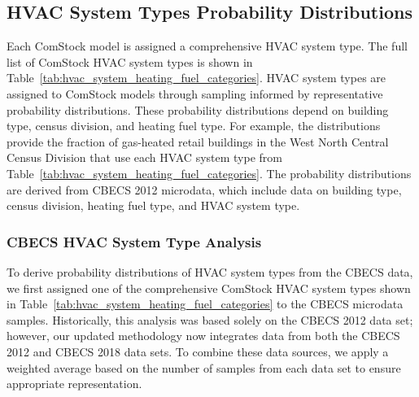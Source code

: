 
\vspace{5mm}
\subsection{HVAC System Types Probability Distributions}
\label{sec:HVAC_System_Type}

Each ComStock model is assigned a comprehensive HVAC system type. The full list of ComStock HVAC system types is shown in Table~\ref{tab:hvac_system_heating_fuel_categories}. HVAC system types are assigned to ComStock models through sampling informed by representative probability distributions. These probability distributions depend on building type, census division, and heating fuel type. For example, the distributions provide the fraction of gas-heated retail buildings in the West North Central Census Division that use each HVAC system type from Table~\ref{tab:hvac_system_heating_fuel_categories}. The probability distributions are derived from CBECS 2012 microdata, which include data on building type, census division, heating fuel type, and HVAC system type.



\subsubsection{CBECS HVAC System Type Analysis}

To derive probability distributions of HVAC system types from the CBECS data, we first assigned one of the comprehensive ComStock HVAC system types shown in Table~\ref{tab:hvac_system_heating_fuel_categories} to the CBECS microdata samples. Historically, this analysis was based solely on the CBECS 2012 data set; however, our updated methodology now integrates data from both the CBECS 2012 and CBECS 2018 data sets. To combine these data sources, we apply a weighted average based on the number of samples from each data set to ensure appropriate representation.

